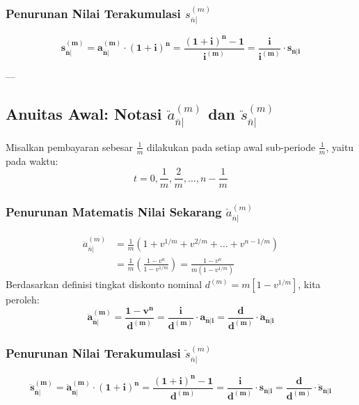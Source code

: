 \documentclass[11pt,a4paper]{article}
\begin{document}
\subsubsection{Penurunan Nilai Terakumulasi \texorpdfstring{$s_{\overline{n}|}^{(m)}$}{s\_n\textasciicircum(m)}}
\begin{equation}
    \mathbf{s_{\overline{n}|}^{(m)} = a_{\overline{n}|}^{(m)} \cdot (1+i)^n = \frac{(1+i)^n - 1}{i^{(m)}} = \frac{i}{i^{(m)}} \cdot s_{\overline{n}|i}}
\end{equation}

---

\subsection{Anuitas Awal: Notasi \texorpdfstring{$\ddot{a}_{\overline{n}|}^{(m)}$}{a\_ddot\_n\textasciicircum(m)} dan \texorpdfstring{$\ddot{s}_{\overline{n}|}^{(m)}$}{s\_ddot\_n\textasciicircum(m)}}

Misalkan pembayaran sebesar $\frac{1}{m}$ dilakukan pada setiap awal sub-periode $\frac{1}{m}$, yaitu pada waktu:
\begin{equation*}
    t = 0, \frac{1}{m}, \frac{2}{m}, \dots, n - \frac{1}{m}
\end{equation*}

\subsubsection{Penurunan Matematis Nilai Sekarang \texorpdfstring{$\ddot{a}_{\overline{n}|}^{(m)}$}{a\_ddot\_n\textasciicircum(m)}}
\begin{align}
    \ddot{a}_{\overline{n}|}^{(m)} &= \frac{1}{m} \left( 1 + v^{1/m} + v^{2/m} + \dots + v^{n - 1/m} \right) \nonumber\\[0.3em]
    &= \frac{1}{m} \left( \frac{1 - v^n}{1 - v^{1/m}} \right) = \frac{1 - v^n}{m \left( 1 - v^{1/m} \right)}
\end{align}
Berdasarkan definisi tingkat diskonto nominal $d^{(m)} = m[1 - v^{1/m}]$, kita peroleh:
\begin{equation}
    \mathbf{\ddot{a}_{\overline{n}|}^{(m)} = \frac{1 - v^n}{d^{(m)}} = \frac{i}{d^{(m)}} \cdot a_{\overline{n}|i} = \frac{d}{d^{(m)}} \cdot \ddot{a}_{\overline{n}|i}}
\end{equation}

\subsubsection{Penurunan Nilai Terakumulasi \texorpdfstring{$\ddot{s}_{\overline{n}|}^{(m)}$}{s\_ddot\_n\textasciicircum(m)}}
\begin{equation}
    \mathbf{\ddot{s}_{\overline{n}|}^{(m)} = \ddot{a}_{\overline{n}|}^{(m)} \cdot (1+i)^n = \frac{(1+i)^n - 1}{d^{(m)}} = \frac{i}{d^{(m)}} \cdot s_{\overline{n}|i} = \frac{d}{d^{(m)}} \cdot \ddot{s}_{\overline{n}|i}}
\end{equation}
\end{document}
